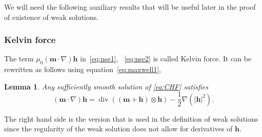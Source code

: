 \documentclass[10pt,letterpaper,twoside]{amsart}
\newtheorem{lemma}{Lemma}[section]
\newtheorem{remark}[lemma]{Remark}
\theoremstyle{definition}{\newtheorem{definition}[lemma]{Definition}}
\theoremstyle{note}{\newtheorem{claim}{Claim}[section]
\newtheorem*{claim*}{Claim}}
\numberwithin{equation}{section}
\newcommand{\Grad}{\nabla}
\newcommand{\Div}{\operatorname{div}}
\newcommand{\bm}{\mathbf{m}}
\newcommand{\bh}{\mathbf{h}}
\begin{document}
We will need the following auxiliary results that will be useful later in the proof of existence of weak solutions.


\subsubsection{Kelvin force}
The term $\mu_0 (\bm\cdot\Grad)\bh$ in~\eqref{eq:nse1}, ~\eqref{eq:nse2} is called Kelvin force. It can be rewritten as follows using equation~\eqref{eq:maxwell1}, 
\begin{lemma}\label{lem:integrableweaksol}\cite[Lemma 2.3]{Nochetto2019}
	Any sufficiently smooth solution of \eqref{eq:CHF} satisfies
	\begin{equation}\label{eq:kelvin}
		(\bm\cdot\Grad)\bh = \Div\left((\bm+\bh)\otimes \bh \right) -\frac{1}{2}\Grad \left(|\bh|^2\right).
	\end{equation}
\end{lemma}
The right hand side is the version that is used in the definition of weak solutions since the regularity of the weak solution does not allow for derivatives of $\bh$.
\end{document}
